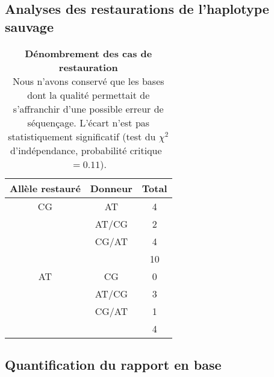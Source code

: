 


\subsection{Analyses des restaurations de l'haplotype sauvage}
\label{subsec:restaur}

\lipsum[1]

\begin{table}[htbp]
  \centering
  \rmfamily
  \begin{tabular}{ccc}
    \toprule
    Allèle restauré & Donneur & Total                    \\
    \midrule
    CG              & AT      & 4                        \\
                    & AT/CG   & 2                        \\
                    & CG/AT   & 4                        \\
                    &         & \cellcolor{LightGray} 10 \\
    \midrule[0.1pt]
    AT              & CG      & 0                        \\
                    & AT/CG   & 3                        \\
                    & CG/AT   & 1                        \\
                    &         & \cellcolor{LightGray} 4  \\
    \bottomrule
  \end{tabular}
  \caption[Dénombrement des cas de restauration]{\textbf{Dénombrement des cas de
      restauration} \\
    \rmfamily Nous n'avons conservé que les bases dont la qualité permettait de
    s'affranchir d'une possible erreur de séquençage. L'écart n'est pas
    statistiquement significatif (test du \(\chi^2\) d'indépendance, probabilité
    critique~\(= 0.11\)).
  }
  \label{tab:restaur}
\end{table}

\subsection{Quantification du rapport en base}
\label{subsec:tauxgc}


